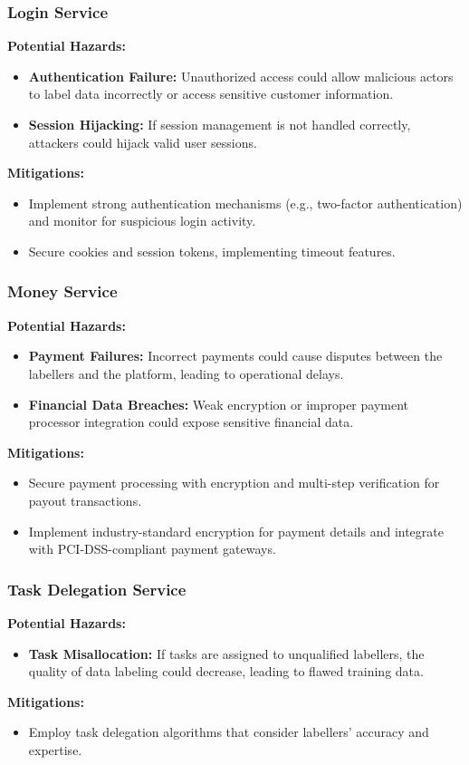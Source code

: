 \documentclass{article}
\begin{document}
\subsubsection{Login Service}
\textbf{Potential Hazards:}
\begin{itemize}
    \item \textbf{Authentication Failure:} Unauthorized access could allow malicious actors to label data incorrectly or access sensitive customer information.
    \item \textbf{Session Hijacking:} If session management is not handled correctly, attackers could hijack valid user sessions.
\end{itemize}
\textbf{Mitigations:}
\begin{itemize}
    \item Implement strong authentication mechanisms (e.g., two-factor authentication) and monitor for suspicious login activity.
    \item Secure cookies and session tokens, implementing timeout features.
\end{itemize}

\subsubsection{Money Service}
\textbf{Potential Hazards:}
\begin{itemize}
    \item \textbf{Payment Failures:} Incorrect payments could cause disputes between the labellers and the platform, leading to operational delays.
    \item \textbf{Financial Data Breaches:} Weak encryption or improper payment processor integration could expose sensitive financial data.
\end{itemize}
\textbf{Mitigations:}
\begin{itemize}
    \item Secure payment processing with encryption and multi-step verification for payout transactions.
    \item Implement industry-standard encryption for payment details and integrate with PCI-DSS-compliant payment gateways.
\end{itemize}

\subsubsection{Task Delegation Service}
\textbf{Potential Hazards:}
\begin{itemize}
    \item \textbf{Task Misallocation:} If tasks are assigned to unqualified labellers, the quality of data labeling could decrease, leading to flawed training data.
\end{itemize}
\textbf{Mitigations:}
\begin{itemize}
    \item Employ task delegation algorithms that consider labellers’ accuracy and expertise.
\end{itemize}
\end{document}
